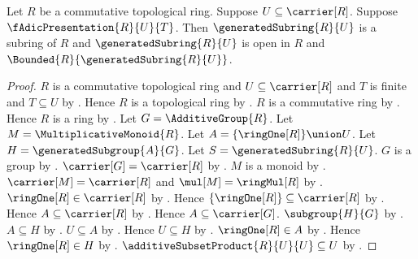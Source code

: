 \begin{theorem}\label{f_adic_presentation_generated_subring_open_bounded}
    Let $R$ be a commutative topological ring.
    Suppose $U\subseteq\carrier[R]$.
    Suppose $\fAdicPresentation{R}{U}{T}$.
    Then $\generatedSubring{R}{U}$ is a subring of $R$ and
        $\generatedSubring{R}{U}$ is open in $R$ and
        $\Bounded{R}{\generatedSubring{R}{U}}$.
\end{theorem}
\begin{proof}
    $R$ is a commutative topological ring and
        $U\subseteq\carrier[R]$ and $T$ is finite and $T\subseteq U$ by
        .
    Hence $R$ is a topological ring by
        .
    $R$ is a commutative ring by
        .
    Hence $R$ is a ring by .
    Let $G=\AdditiveGroup{R}$.
    Let $M=\MultiplicativeMonoid{R}$.
    Let $A=\{\ringOne[R]\}\union U$.
    Let $H=\generatedSubgroup{A}{G}$.
    Let $S=\generatedSubring{R}{U}$.
    $G$ is a group by .
    $\carrier[G]=\carrier[R]$ by .
    $M$ is a monoid by .
    $\carrier[M]=\carrier[R]$ and $\mul[M]=\ringMul[R]$ by
        .
    $\ringOne[R]\in\carrier[R]$ by .
    Hence $\{\ringOne[R]\}\subseteq\carrier[R]$ by
        .
    Hence $A\subseteq\carrier[R]$ by .
    Hence $A\subseteq\carrier[G]$.
    $\subgroup{H}{G}$ by
        .
    $A\subseteq H$ by .
    $U\subseteq A$ by .
    Hence $U\subseteq H$ by .
    $\ringOne[R]\in A$ by .
    Hence $\ringOne[R]\in H$ by .
    $\additiveSubsetProduct{R}{U}{U}\subseteq U$ by
        .


\end{proof}
